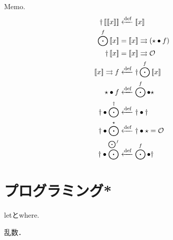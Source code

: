 \documentclass[twocolumn]{jsbook}
\newcommand{\mathidentity}{\mathcal{O}}
\begin{document}
Memo.
\begin{align*}
\monadjoin\monad{\monad{x}}&\defeq\monad{x}\\
\mapfunc^f\monad{x}&=\monad{x}\bind(\unit\comp f)\\
\monadjoin\monad{x}&=\monad{x}\bind\mathidentity\\
\monad{x}\bind f&\defeq\monadjoin\mapfunc^f\monad{x}\\
\unit\comp f&\defeq\mapfunc^f\comp\unit\\
\monadjoin\comp\mapfunc^\monadjoin&\defeq\monadjoin\comp\monadjoin\\
\monadjoin\comp\mapfunc^\unit&\defeq\monadjoin\comp\unit=\mathidentity\\
\monadjoin\comp\mapfunc^{\mapfunc^f}&\defeq\mapfunc^f\comp\monadjoin
\end{align*}

\chapter{プログラミング*}

letとwhere.

乱数．
\end{document}
